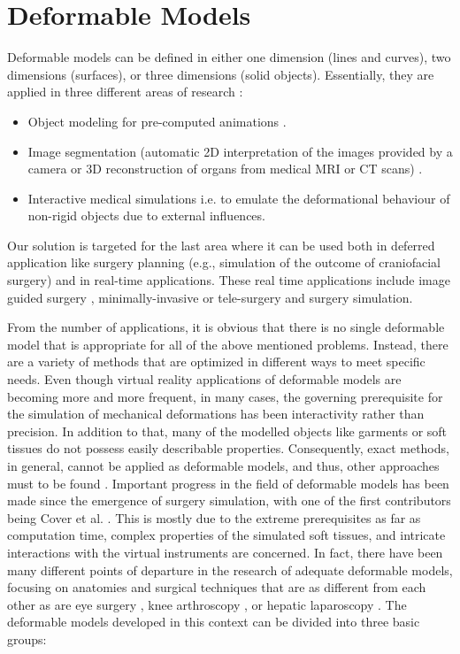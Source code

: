 \section{Deformable Models}
Deformable models can be defined in either one dimension (lines and curves), two dimensions (surfaces), or three dimensions (solid objects). 
Essentially, they are applied in three different areas of research \cite{Meier2005}: 

\begin{itemize}
 \item Object modeling for pre-computed animations \cite{coquillart1990extended, hsu1992direct}.
 \item Image segmentation (automatic 2D interpretation of the images provided by a camera or 3D reconstruction of organs from medical MRI 
 or CT scans) \cite{neveu1994recovery}.
 \item Interactive medical simulations i.e. to emulate the deformational behaviour of non-rigid objects due to external influences.
\end{itemize}

Our solution is targeted for the last area where it can be used both in deferred application like surgery planning (e.g., simulation of the 
outcome of craniofacial surgery) \cite{bro1995modelling, keeve1996craniofacial} and in real-time applications. These real time applications 
include image guided surgery \cite{szekely2000modelling}, minimally-invasive or tele-surgery and surgery simulation. 

From the number of applications, it is obvious that there is no single deformable model that is appropriate for all of the above mentioned 
problems. Instead, there are a variety of methods that are optimized in different ways to meet specific needs. Even though virtual reality 
applications of deformable models are becoming more and more frequent, in many cases, the governing prerequisite for the simulation of 
mechanical deformations has been interactivity rather than precision. In addition to that, many of the modelled objects like garments or soft 
tissues do not possess easily describable properties. Consequently, exact methods, in general, cannot be applied as deformable models, and thus, 
other approaches must to be found \cite{bro1998finite}. Important progress in the field of deformable models has been made since the emergence of surgery 
simulation, with one of the first contributors being Cover et al. \cite{cover1993interactively}. This is mostly due to the extreme prerequisites 
as far as computation time, complex properties of the simulated soft tissues, and intricate interactions with the virtual instruments are concerned. 
In fact, there have been many different points of departure in the research of adequate deformable models, focusing on anatomies and surgical techniques 
that are as different from each other as are eye surgery \cite{cai2001parametric, sagar1994virtual}, knee arthroscopy \cite{gibson1997simulating, 
hoffman1998commercially}, or hepatic laparoscopy \cite{cotin1999real}. The deformable models developed in this context can be divided into three basic groups: 


